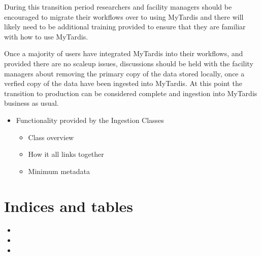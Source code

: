 \documentclass[letterpaper,10pt,english]{sphinxmanual}
\begin{document}
\sphinxAtStartPar
During this transition period researchers and facility managers should be encouraged to migrate their workflows over to using MyTardis and there will likely need to be additional training provided to ensure that they are familiar with how to use MyTardis.

\sphinxAtStartPar
Once a majority of users have integrated MyTardis into their workflows, and provided there are no scale\sphinxhyphen{}up issues, discussions should be held with the facility managers about removing the primary copy of the data stored locally, once a verfied copy of the data have been ingested into MyTardis. At this point the transition to production can be considered complete and ingestion into MyTardis business as usual.
\begin{itemize}
\item {}
\sphinxAtStartPar
Functionality provided by the Ingestion Classes
\begin{itemize}
\item {}
\sphinxAtStartPar
Class overview

\item {}
\sphinxAtStartPar
How it all links together

\item {}
\sphinxAtStartPar
Minimum metadata

\end{itemize}

\end{itemize}


\chapter{Indices and tables}
\label{\detokenize{index:indices-and-tables}}\begin{itemize}
\item {}
\sphinxAtStartPar
{}

\item {}
\sphinxAtStartPar
{}

\item {}
\sphinxAtStartPar
{}

\end{itemize}



\renewcommand{\indexname}{Index}
\printindex
\end{document}
